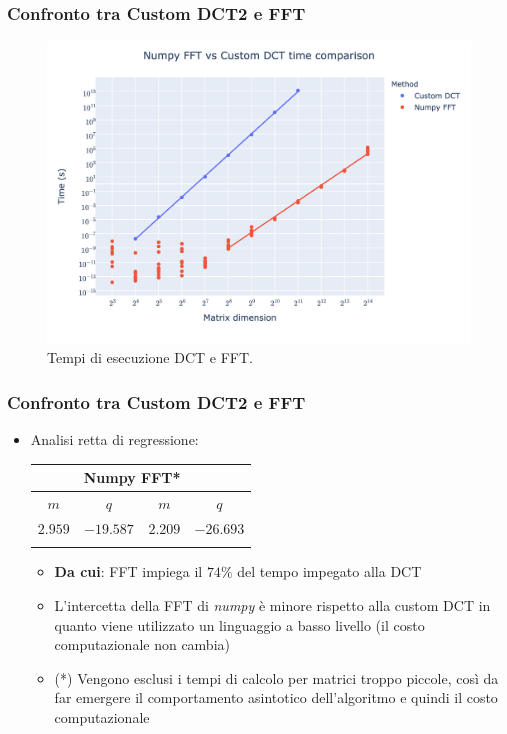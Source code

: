 \documentclass{beamer}
\begin{document}
\begin{frame}
\frametitle{Confronto tra Custom DCT2 e FFT}

	\begin{figure}
		\includegraphics[width=1\textheight]{assets/dct2.png}
		\caption{Tempi di esecuzione DCT e FFT.}
		\label{fig:dct2}
	\end{figure}

\end{frame}

\begin{frame}
	\frametitle{Confronto tra Custom DCT2 e FFT}
	\begin{itemize}
		\item Analisi retta di regressione:\\
		\begin{center}

			\begin{tabular}{cc|cc}
				\firsthline
				\multicolumn{2}{c}{\textbf{Custom DCT}} & \multicolumn{2}{c}{\textbf{Numpy FFT}*} \\
				\hline
				\hline
				$m$    & $q$ & $m$ & $q$  \\
				\hline
				$2.959$ & $-19.587$ & $2.209$&  $-26.693$\\
				\lasthline
			\end{tabular}

		\end{center}

		\begin{itemize}
			\item \textbf{Da cui}: FFT impiega il $74\%$ del tempo impegato alla DCT
			\item L'intercetta della FFT di \textit{numpy} è minore rispetto alla custom DCT in quanto viene utilizzato un linguaggio a basso livello (il costo computazionale non cambia)
		\item (*) Vengono esclusi i tempi di calcolo per matrici troppo piccole, così da far emergere il comportamento asintotico dell'algoritmo e quindi il costo computazionale
		\end{itemize}
	\end{itemize}
\end{frame}
\end{document}
